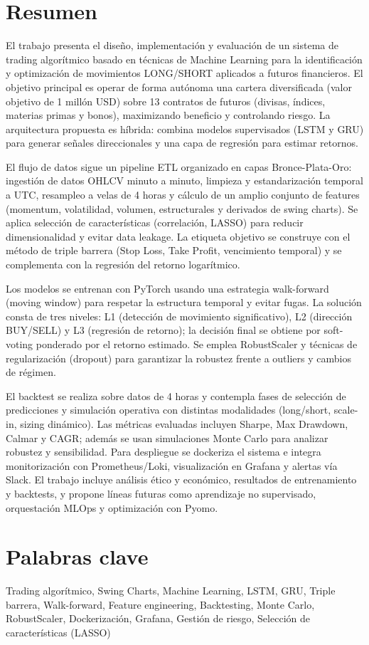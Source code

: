 \setlength{\parindent}{0em}

\section*{Resumen}

El trabajo presenta el diseño, implementación y evaluación de un sistema de trading algorítmico basado en técnicas de Machine Learning para la
identificación y optimización de movimientos LONG/SHORT aplicados a futuros financieros. El objetivo principal es operar de forma autónoma una
cartera diversificada (valor objetivo de 1 millón USD) sobre 13 contratos de futuros (divisas, índices, materias primas y bonos), maximizando
beneficio y controlando riesgo. La arquitectura propuesta es híbrida: combina modelos supervisados (LSTM y GRU) para generar señales direccionales y
una capa de regresión para estimar retornos.

El flujo de datos sigue un pipeline ETL organizado en capas Bronce-Plata-Oro: ingestión de datos OHLCV minuto a minuto, limpieza y estandarización
temporal a UTC, resampleo a velas de 4 horas y cálculo de un amplio conjunto de features (momentum, volatilidad, volumen, estructurales y derivados de
swing charts). Se aplica selección de características (correlación, LASSO) para reducir dimensionalidad y evitar data leakage. La etiqueta objetivo se
construye con el método de triple barrera (Stop Loss, Take Profit, vencimiento temporal) y se complementa con la regresión del retorno logarítmico.

Los modelos se entrenan con PyTorch usando una estrategia walk-forward (moving window) para respetar la estructura temporal y evitar fugas. La
solución consta de tres niveles: L1 (detección de movimiento significativo), L2 (dirección BUY/SELL) y L3 (regresión de retorno); la decisión final se
obtiene por soft-voting ponderado por el retorno estimado. Se emplea RobustScaler y técnicas de regularización (dropout) para garantizar la robustez
frente a outliers y cambios de régimen.

El backtest se realiza sobre datos de 4 horas y contempla fases de selección de predicciones y simulación operativa con distintas modalidades
(long/short, scale-in, sizing dinámico). Las métricas evaluadas incluyen Sharpe, Max Drawdown, Calmar y CAGR; además se usan simulaciones Monte Carlo
para analizar robustez y sensibilidad. Para despliegue se dockeriza el sistema e integra monitorización con Prometheus/Loki, visualización en Grafana
y alertas vía Slack. El trabajo incluye análisis ético y económico, resultados de entrenamiento y backtests, y propone líneas futuras como aprendizaje
no supervisado, orquestación MLOps y optimización con Pyomo.

\section*{Palabras clave}

Trading algorítmico, Swing Charts, Machine Learning, LSTM, GRU, Triple barrera, Walk-forward, Feature engineering, Backtesting, Monte Carlo, RobustScaler, Dockerización, Grafana, Gestión de riesgo, Selección de características (LASSO)